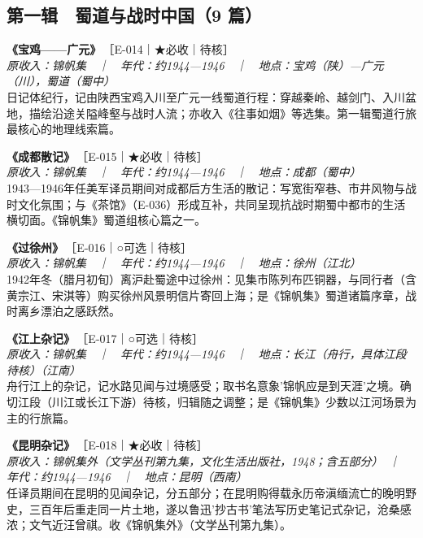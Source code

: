 \documentclass[UTF8,fontset=none,zihao=-4,a4paper]{ctexart}
\begin{document}
\subsection{第一辑　蜀道与战时中国（9 篇）}
\noindent\textbf{《宝鸡——广元》}\,{\small ［E-014｜★必收｜待核］}\\
{\small\itshape 原收入：锦帆集　｜　年代：约1944—1946　｜　地点：宝鸡（陕）—广元（川），蜀道（蜀中）}\\
日记体纪行，记由陕西宝鸡入川至广元一线蜀道行程：穿越秦岭、越剑门、入川盆地，描绘沿途关隘峰壑与战时人流；亦收入《往事如烟》等选集。第一辑蜀道行旅最核心的地理线索篇。
\par\vspace{5pt}
\noindent\textbf{《成都散记》}\,{\small ［E-015｜★必收｜待核］}\\
{\small\itshape 原收入：锦帆集　｜　年代：约1944—1946　｜　地点：成都（蜀中）}\\
1943—1946年任美军译员期间对成都后方生活的散记：写宽街窄巷、市井风物与战时文化氛围；与《茶馆》（E-036）形成互补，共同呈现抗战时期蜀中都市的生活横切面。《锦帆集》蜀道组核心篇之一。
\par\vspace{5pt}
\noindent\textbf{《过徐州》}\,{\small ［E-016｜○可选｜待核］}\\
{\small\itshape 原收入：锦帆集　｜　年代：约1944—1946　｜　地点：徐州（江北）}\\
1942年冬（腊月初旬）离沪赴蜀途中过徐州：见集市陈列布匹铜器，与同行者（含黄宗江、宋淇等）购买徐州风景明信片寄回上海；是《锦帆集》蜀道诸篇序章，战时离乡漂泊之感跃然。
\par\vspace{5pt}
\noindent\textbf{《江上杂记》}\,{\small ［E-017｜○可选｜待核］}\\
{\small\itshape 原收入：锦帆集　｜　年代：约1944—1946　｜　地点：长江（舟行，具体江段待核）（江南）}\\
舟行江上的杂记，记水路见闻与过境感受；取书名意象'锦帆应是到天涯'之境。确切江段（川江或长江下游）待核，归辑随之调整；是《锦帆集》少数以江河场景为主的行旅篇。
\par\vspace{5pt}
\noindent\textbf{《昆明杂记》}\,{\small ［E-018｜★必收｜待核］}\\
{\small\itshape 原收入：锦帆集外（文学丛刊第九集，文化生活出版社，1948；含五部分）　｜　年代：约1944—1946　｜　地点：昆明（西南）}\\
任译员期间在昆明的见闻杂记，分五部分；在昆明购得载永历帝滇缅流亡的晚明野史，三百年后重走同一片土地，遂以鲁迅'抄古书'笔法写历史笔记式杂记，沧桑感浓；文气近汪曾祺。收《锦帆集外》（文学丛刊第九集）。
\end{document}

